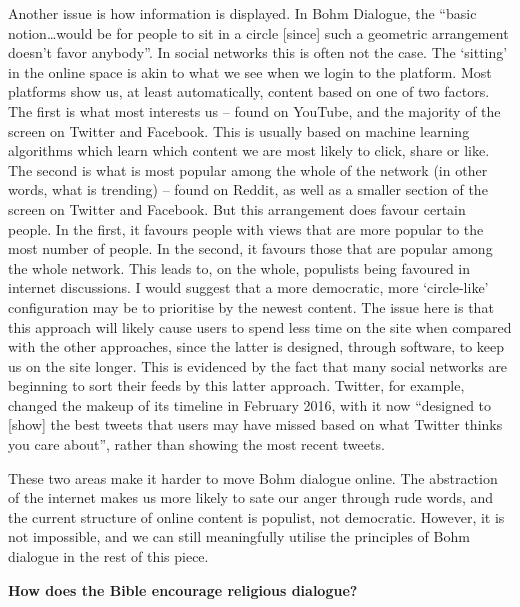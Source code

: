\documentclass[]{article}
\begin{document}
Another issue is how information is displayed. In Bohm Dialogue, the
``basic notion\ldots{}would be for people to sit in a circle {[}since{]}
such a geometric arrangement doesn't favor
anybody''\autocite[pg 17]{BohmDialogue2004}. In social networks this is
often not the case. The `sitting' in the online space is akin to what we
see when we login to the platform. Most platforms show us, at least
automatically, content based on one of two factors. The first is what
most interests us -- found on YouTube, and the majority of the screen on
Twitter and Facebook. This is usually based on machine learning
algorithms which learn which content we are most likely to click, share
or like. The second is what is most popular among the whole of the
network (in other words, what is trending) -- found on Reddit, as well
as a smaller section of the screen on Twitter and Facebook. But this
arrangement does favour certain people. In the first, it favours people
with views that are more popular to the most number of people. In the
second, it favours those that are popular among the whole network. This
leads to, on the whole, populists being favoured in internet
discussions. I would suggest that a more democratic, more `circle-like'
configuration may be to prioritise by the newest content. The issue here
is that this approach will likely cause users to spend less time on the
site when compared with the other approaches, since the latter is
designed, through software, to keep us on the site longer. This is
evidenced by the fact that many social networks are beginning to sort
their feeds by this latter approach. Twitter, for example, changed the
makeup of its timeline in February 2016, with it now ``designed to
{[}show{]} the best tweets that users may have missed based on what
Twitter thinks you care about''\autocite{LynleyTwitterWillNow2016},
rather than showing the most recent tweets.

These two areas make it harder to move Bohm dialogue online. The
abstraction of the internet makes us more likely to sate our anger
through rude words, and the current structure of online content is
populist, not democratic. However, it is not impossible, and we can
still meaningfully utilise the principles of Bohm dialogue in the rest
of this piece.

\newpage 

\textbf{How does the Bible encourage religious dialogue?}
\end{document}
